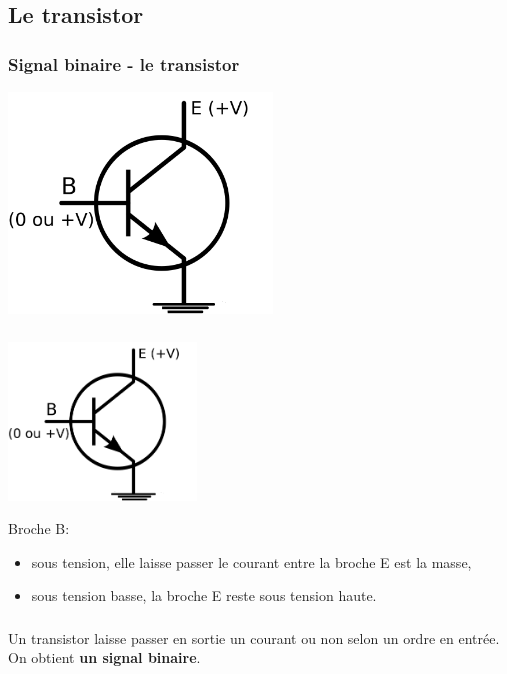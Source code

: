\documentclass[svgnames,11pt]{beamer}
\begin{document}
\subsection{Le transistor}
\begin{frame}
    \frametitle{Signal binaire - le transistor}

    \begin{center}
        \centering
        \includegraphics[width=7cm]{ressources/transistor-schema.png}
        \label{IMG}
    \end{center}

\end{frame}
\begin{frame}
    \frametitle{}
    \begin{center}
        \includegraphics[width=5cm]{ressources/transistor-schema.png}
    \end{center}

    Broche B:
    \begin{itemize}
        \item sous tension, elle laisse passer le courant entre la broche E est la masse,
        \item sous tension basse, la broche E reste sous tension haute.
    \end{itemize}
\end{frame}
\begin{frame}
    \frametitle{}


    \begin{aretenir}[]
        Un transistor laisse passer en sortie un courant ou non selon un ordre en entrée. On obtient \textbf{un signal binaire}.
    \end{aretenir}

\end{frame}
\end{document}
